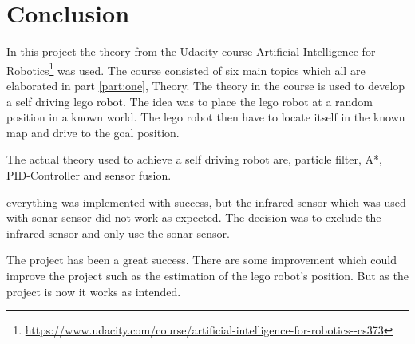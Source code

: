 \chapter{Conclusion}
\label{chp:conc}

In this project the theory from the Udacity course Artificial Intelligence for Robotics\footnote{\url{https://www.udacity.com/course/artificial-intelligence-for-robotics--cs373}} was used. The course consisted of six main topics which all are elaborated in part \ref{part:one}, Theory. The theory in the course is used to develop a self driving lego robot. The idea was to place the lego robot at a random position in a known world. The lego robot then have to locate itself in the known map and drive to the goal position.

The actual theory used to achieve a self driving robot are, particle filter, A*, PID-Controller and sensor fusion.

everything was implemented with success, but the infrared sensor which was used with sonar sensor did not work as expected. The decision was to exclude the infrared sensor and only use the sonar sensor.

The project has been a great success. There are some improvement which could improve the project such as the estimation of the lego robot's position. But as the project is now it works as intended.
